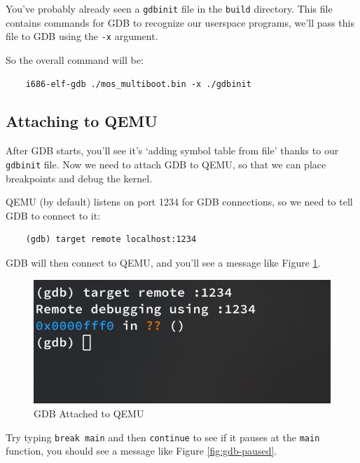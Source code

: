 You've probably already seen a \texttt{gdbinit} file in the \texttt{build} directory. This file
contains commands for GDB to recognize our userspace programs, we'll pass this file to GDB using
the \texttt{-x} argument.

So the overall command will be:

\begin{verbatim}
    i686-elf-gdb ./mos_multiboot.bin -x ./gdbinit
\end{verbatim}

\subsection{Attaching to QEMU} \label{sec:gdb-attach}

After GDB starts, you'll see it's `adding symbol table from file' thanks to our \texttt{gdbinit} file.
Now we need to attach GDB to QEMU, so that we can place breakpoints and debug the kernel.

QEMU (by default) listens on port 1234 for GDB connections, so we need to tell GDB to connect to it:

\begin{verbatim}
    (gdb) target remote localhost:1234
\end{verbatim}

GDB will then connect to QEMU, and you'll see a message like Figure \ref{fig:gdb-attached}.

\begin{figure}[ht]
    \centering
    \includegraphics[width=\textwidth]{assets/c1.gdb-attached.png}
    \caption{GDB Attached to QEMU}
    \label{fig:gdb-attached}
\end{figure}

Try typing \texttt{break main} and then \texttt{continue} to see if it pauses at the \texttt{main}
function, you should see a message like Figure \ref{fig:gdb-paused}.

